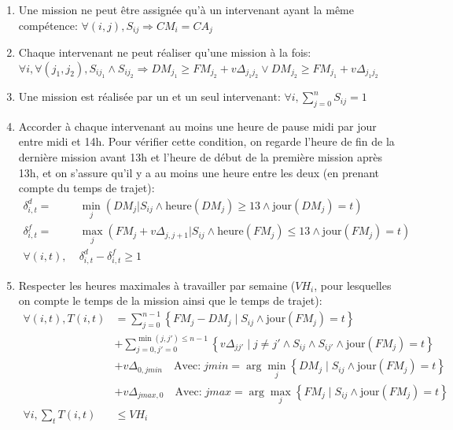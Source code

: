 \documentclass[11pt]{article}
\begin{document}
\begin{enumerate}
    \item Une mission ne peut être assignée qu'à un intervenant ayant la même compétence: $\forall (i, j), S_{ij} \Rightarrow CM_i = CA_j$
    \item Chaque intervenant ne peut réaliser qu'une mission à la fois: $\forall i, \forall (j_1, j_2), S_{ij_1} \land S_{ij_2} \Rightarrow DM_{j_1} \geq FM_{j_2} + v\Delta_{j_1 j_2} \lor DM_{j_2} \geq FM_{j_1} + v\Delta_{j_1 j_2}$
    \item Une mission est réalisée par un et un seul intervenant: $\forall i, \sum_{j=0}^n{S_{ij}} = 1$
    \item Accorder à chaque intervenant au moins une heure de pause midi par jour entre midi et 14h.
    Pour vérifier cette condition, on regarde l'heure de fin de la dernière mission avant 13h et l'heure de début de la première mission après 13h, et on s'assure qu'il y a au moins une heure entre les deux (en prenant compte du temps de trajet):
    \begin{align*}
        \delta^d_{i,t} =& \min_j(DM_j | S_{ij} \land \text{heure}(DM_j) \geq 13 \land \text{jour}(DM_j) = t) \\
        \delta^f_{i,t} =& \max_j(FM_j + v\Delta_{j,j+1} | S_{ij} \land \text{heure}(FM_j) \leq 13 \land \text{jour}(FM_j) = t) \\
        \forall (i, t),\; &\delta^d_{i,t} - \delta^f_{i,t} \geq 1
    \end{align*}
    \item Respecter les heures maximales à travailler par semaine ($VH_i$, pour lesquelles on compte le temps de la mission ainsi que le temps de trajet): \begin{align*}
        \forall (i, t), T(i, t) &=
            \sum_{j=0}^{n-1} \left\{FM_j - DM_j \;|\; S_{ij} \land \text{jour}(FM_j) = t \right\} \\
            &+ \sum_{j=0,j'=0}^{\min(j,j') \leq n-1} \left\{ v\Delta_{jj'} \;|\; j \neq j' \land S_{ij} \land S_{ij'} \land \text{jour}(FM_j) = t \right\} \\
            &+ v\Delta_{0,jmin} \quad \text{Avec:} \; jmin = \arg\min_j\left\{DM_j \;|\; S_{ij} \land \text{jour}(FM_j) = t
            \right\} \\
            &+ v\Delta_{jmax,0} \quad \text{Avec:} \; jmax = \arg\max_j\left\{FM_j \;|\; S_{ij} \land \text{jour}(FM_j) = t
            \right\} \\
        \forall i, \sum_t T(i, t) &\leq VH_i
    \end{align*}

\end{enumerate}
\end{document}
